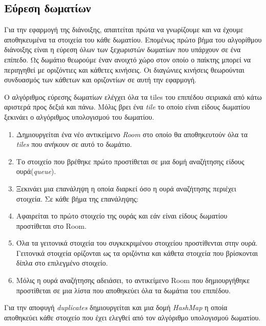 \subsection{Εύρεση δωματίων}
\par
Για την εφαρμογή της διάνοιξης, απαιτείται πρώτα να γνωρίζουμε και να έχουμε αποθηκευμένα τα στοιχεία του κάθε δωματίου. Επομένως πρώτο βήμα του αλγορίθμου διάνοιξης είναι η εύρεση όλων των ξεχωριστών δωματίων που υπάρχουν σε ένα επίπεδο. Ως δωμάτιο θεωρούμε έναν ανοιχτό χώρο στον οποίο ο παίκτης μπορεί να περιηγηθεί με οριζόντιες και κάθετες κινήσεις. Οι διαγώνιες κινήσεις θεωρούνται συνδυασμός των κάθετων και οριζοντίων σε αυτή την εφαρμογή.
\par
O αλγόριθμος εύρεσης δωματίων ελέγχει όλα τα tiles του επιπέδου σειριακά από κάτω αριστερά προς δεξιά και πάνω. Μόλις βρει ένα \textit{tile} το οποίο είναι είδους δωματίου ξεκινάει ο αλγόριθμος υπολογισμού του δωματίου. 
\begin{enumerate}
\item Δημιουργείται ένα νέο αντικείμενο \textit{Room} στο οποίο θα αποθηκευτούν όλα τα \textit{tiles} που ανήκουν σε αυτό το δωμάτιο.
\item Το στοιχείο που βρέθηκε πρώτο προστίθεται σε μια δομή αναζήτησης είδους ουρά(\textit{queue}).
\item Ξεκινάει μια επανάληψη η οποία διαρκεί όσο η ουρά αναζήτησης περιέχει στοιχεία. Σε κάθε βήμα της επανάληψης:
\item Αφαιρείται το πρώτο στοιχείο της ουράς και εάν είναι είδους δωματίου προστίθεται στο Room.
\item Όλα τα γειτονικά στοιχεία του συγκεκριμένου στοιχείου προστίθενται στην ουρά. Γειτονικά στοιχεία ορίζονται ως τα οριζόντια και κάθετα στοιχεία που βρίσκονται δίπλα στο επιλεγμένο στοιχείο.
\item Μόλις η ουρά αναζήτησης αδειάσει, το αντικείμενο Room που δημιουργήθηκε προστίθεται σε μια λίστα που αποθηκεύει όλα τα δωμάτια του επιπέδου.
\end{enumerate}
Για την αποφυγή \textit{duplicates} δημιουργείται και μια δομή \textit{HashMap} η οποία αποθηκεύει κάθε στοιχείο που έχει ελεγθεί από τον αλγόριθμο υπολογισμού δωματίου.

